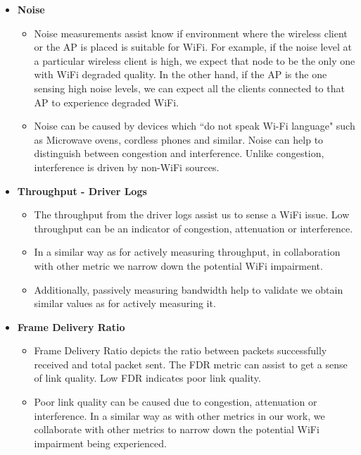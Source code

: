 \begin{itemize}
	\item \textbf{Noise}
	\begin{itemize}
		\item  Noise measurements assist know if environment where the wireless client or the AP is placed is suitable for WiFi. For example, if the noise level at a particular wireless client is high, we expect that node to be the only one with WiFi degraded quality. In the other hand, if the AP is the one sensing high noise levels, we can expect all the clients connected to that AP to experience degraded WiFi.
		\item Noise can be caused by devices which ``do not speak Wi-Fi language" such as Microwave ovens, cordless phones and similar. Noise can help to distinguish between congestion and interference. Unlike congestion, interference is driven by non-WiFi sources.
	\end{itemize}
	
	\item \textbf{Throughput - Driver Logs}
	\begin{itemize}
		\item The throughput from the driver logs assist us to sense a WiFi issue. Low throughput can be an indicator of congestion, attenuation or interference.
		\item In a similar way as for actively measuring throughput, in collaboration with other metric we narrow down the potential WiFi impairment.
		\item Additionally, passively measuring bandwidth help to validate we obtain similar values as for actively measuring it.
	\end{itemize}
	\newpage
	\item \textbf{Frame Delivery Ratio}
	\begin{itemize}
		\item Frame Delivery Ratio depicts the ratio between packets successfully received and total packet sent. The FDR metric can assist to get a sense of link quality. Low FDR indicates poor link quality. 
		\item Poor link quality can be caused due to congestion, attenuation or interference. In a similar way as with other metrics in our work, we collaborate with other metrics to narrow down the potential WiFi impairment being experienced.
	\end{itemize}

\end{itemize}

